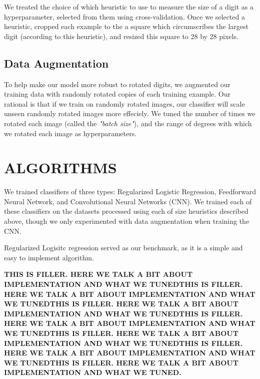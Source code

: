 \documentclass[letterpaper, 10 pt, conference]{ieeeconf}  %
\begin{document}
We treated the choice of which heuristic to use to measure the size of a digit as a hyperparameter, selected from them using cross-validation. Once we selected a heuristic, cropped each example to the a square which circumscribes the largest digit (according to this heuristic), and resized this square to 28 by 28 pixels. 

\subsection{Data Augmentation} 

To help make our model more robust to rotated digits, we augmented our training data with randomly rotated copies of each training example. Our rational is that if we train on randomly rotated images, our classifier will scale unseen randomly rotated images more effeciely. We tuned the number of times we rotated each image (called the \emph{"batch size"}), and the range of degrees with which we rotated each image as hyperparameters. 


\section{ALGORITHMS}

We trained classifiers of three types: Regularized Logistic Regression, Feedforward Neural Network, and Convolutional Neural Networks (CNN). We trained each of these classifiers on the datasets processed using each of size heuristics described above, though we only experimented with data augmentation when training the CNN.

Regularized Logisitc regression served as our benchmark, as it is a simple and easy to implement algorithm. 

\textbf{THIS IS FILLER. HERE WE TALK A BIT ABOUT IMPLEMENTATION AND WHAT WE TUNEDTHIS IS FILLER. HERE WE TALK A BIT ABOUT IMPLEMENTATION AND WHAT WE TUNEDTHIS IS FILLER. HERE WE TALK A BIT ABOUT IMPLEMENTATION AND WHAT WE TUNEDTHIS IS FILLER. HERE WE TALK A BIT ABOUT IMPLEMENTATION AND WHAT WE TUNEDTHIS IS FILLER. HERE WE TALK A BIT ABOUT IMPLEMENTATION AND WHAT WE TUNEDTHIS IS FILLER. HERE WE TALK A BIT ABOUT IMPLEMENTATION AND WHAT WE TUNEDTHIS IS FILLER. HERE WE TALK A BIT ABOUT IMPLEMENTATION AND WHAT WE TUNED.}
\end{document}

